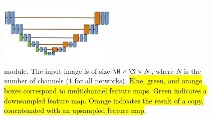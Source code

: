 \renewcommand{\captiontitle}{\UNet{} module}
\begin{figure}
\centering
\includegraphics[clip, trim=0 0 0 0,width=0.5\textwidth]{./data/unet-module.png}
\caption[\captiontitle]{\captiontitle{}.  The input image is of size $\N \times \N \times N$, where $N$ is the number of channels ($1$ for all networks).  
\hl{Blue, green, and orange boxes correspond to multichannel feature maps.  Green indicates a downsampled feature map.  Orange indicates the result of a copy, concatenated with an upsampled feature map}.}
\label{fig:unet-module}
\end{figure}

